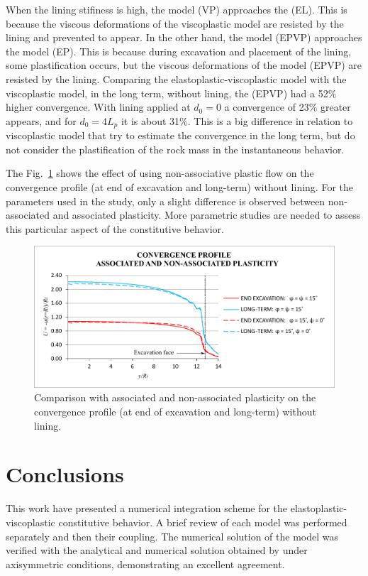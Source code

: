\documentclass[Journal,letterpaper]{ascelike-new}
\begin{document}
When the lining stifiness is high, the model (VP) approaches the (EL). This is because the viscous deformations of the viscoplastic model are resisted by the lining and prevented to appear. In the other hand, the model (EPVP) approaches the model (EP). This is because during excavation and placement of the lining, some plastification occurs, but the viscous deformations of the model (EPVP) are resisted by the lining. Comparing the elastoplastic-viscoplastic  model with the viscoplastic model, in the long term, without lining, the (EPVP) had a 52\% higher convergence. With lining applied at $d_0=0$ a convergence of 23\% greater appears, and for $d_0=4L_p$ it is about 31\%. This is a big difference in relation to viscoplastic model that try to estimate the convergence in the long term, but do not consider the plastification of the rock mass in the instantaneous behavior.

The Fig.~\ref{unassociated_plasticity} shows the effect of using non-associative plastic flow on the convergence profile (at end of excavation and long-term) without lining. For the parameters used in the study, only a slight difference is observed between non-associated and associated plasticity. More parametric studies are needed to assess this particular aspect of the  constitutive behavior.

\begin{figure}
	\centering
	\includegraphics[scale = 1.0]{FIG8.pdf}
	\caption{\label{unassociated_plasticity}Comparison with associated and non-associated plasticity on the convergence profile (at end of excavation and long-term) without lining.}
\end{figure}

\section{Conclusions}

This work have presented a numerical integration scheme for the elastoplastic-viscoplastic constitutive behavior. A brief review of each model was performed separately and then their coupling. The numerical solution of the model was verified with the analytical and numerical solution obtained by  under axisymmetric conditions, demonstrating an excellent agreement. 
\end{document}
